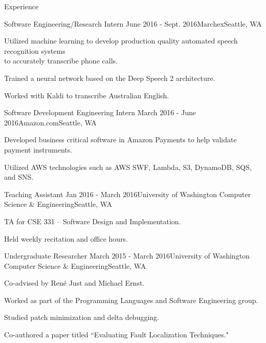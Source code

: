 \documentclass{resume} %
\begin{document}
\begin{rSection}{Experience}

  \begin{rSubsection}{Software Engineering/Research Intern}
    {June 2016 - Sept. 2016}{Marchex}{Seattle, WA}
  \item Utilized machine learning to develop production quality automated speech recognition systems \\ to accurately transcribe phone calls.
  \item Trained a neural network based on the Deep Speech 2 architecture.
  \item Worked with Kaldi to transcribe Australian English.
  \end{rSubsection}

  \begin{rSubsection}{Software Development Engineering Intern}
    {March 2016 - June 2016}{Amazon.com}{Seattle, WA}
  \item Developed business critical software in Amazon Payments to help validate payment instruments.
  \item Utilized AWS technologies such as AWS SWF, Lambda, S3, DynamoDB, SQS, and SNS.
  \end{rSubsection}

  \begin{rSubsection}{Teaching Assistant}
    {Jan 2016 - March 2016}{University of Washington Computer Science \& Engineering}{Seattle, WA}
  \item TA for CSE 331 -- Software Design and Implementation.
  \item Held weekly recitation and office hours.
  \end{rSubsection}

  \begin{rSubsection}{Undergraduate Researcher}
    {March 2015 - March 2016}{University of Washington Computer Science \& Engineering}{Seattle, WA}
  \item Co-advised by Ren{\'e} Just and Michael Ernst.
  \item Worked as part of the Programming Languages and Software Engineering group.
  \item Studied patch minimization and delta debugging.
  \item Co-authored a paper titled ``Evaluating Fault Localization Techniques."

  \end{rSubsection}

\end{rSection}
\end{document}
